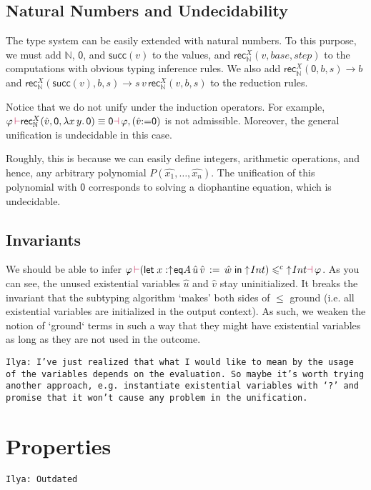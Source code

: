 \documentclass[a4,natbib=false]{article}
\newcommand{\ilyam}[1]{{\color{red} \texttt{Ilya:  #1}}}
\newcommand{\fun}[2]{\lambda {#1}.\,{#2}}
\newcommand{\letname}{\mathsf{let}}
\newcommand{\letval}[3]{\letname\; {#1} \,:=\, {#2} \;\mathsf{in}\; {#3}}
\newcommand{\valtocomp}[1]{\uparrow \hspace{-2pt} #1}
\newcommand{\eqtype}[3]{\mathsf{eq}{#1}\,{#2}\,{#3}}
\newcommand{\csubt}{\leqslant^c}
\newcommand{\evarassign}[2]{({#1} \mathsf{:=} {#2})}
\newcommand{\reduces}[2]{{#1} \rightarrow {#2}}
\newcommand{\nattype}{\mathbb{N}}
\newcommand{\natzero}{\mathsf{0}}
\newcommand{\natsucc}[1]{\mathsf{succ}({#1})}
\newcommand{\recnat}[4]{\mathsf{rec}_{\nattype}^{#2}({#1},{#3},{#4})}
\newcommand{\judgeacsubt}[4]{{#1}\,{\color{purple}\vdash} {#2} \csubt {#3} {\color{purple}\dashv}\,{#4}}
\newcommand{\judgeunify}[4]{{#1}\,{\color{purple}\vdash} {#2} \equiv {#3} {\color{purple}\dashv}\,{#4}}
\begin{document}
\subsection{Natural Numbers and Undecidability}

The type system can be easily extended with natural numbers. To this purpose, we
must add $\nattype$, $\natzero$, and $\natsucc{v}$ to the values, and
$\recnat{v}{X}{base}{step}$ to the computations with obvious typing inference
rules.
We also add $\reduces{\recnat{\natzero}{X}{b}{s}}{b}$ and
$\reduces{\recnat{\natsucc{v}}{X}{b}{s}}{s \, v \, \recnat{v}{X}{b}{s}}$ to the reduction rules.

Notice that we do not unify under the induction operators. For example,
$\judgeunify{\varphi}{\recnat{\hat{v}}{X}{\natzero}{\fun{x\,y}{\natzero}}}{\natzero}{\varphi, \evarassign{\hat{v}}{\natzero}}$
is not admissible.
Moreover, the general unification is undecidable in this case.

Roughly, this is because we can easily define integers,
arithmetic operations, and hence, any arbitrary polynomial
$P(\hat{x_1}, \dots, \hat{x_n})$.
The unification of this polynomial with $\natzero$
corresponds to solving a diophantine equation, which is undecidable.

\subsection{Invariants}

We should be able to infer
$\judgeacsubt{\varphi}{(\letval{x:\valtocomp{\eqtype{A}{\hat{u}}{\hat{v}}}}{\hat{w}}{\valtocomp{Int}})}{\valtocomp{Int}}{\varphi}$.
As you can see, the unused existential variables $\hat{u}$ and $\hat{v}$ stay uninitialized.
It breaks the invariant that the subtyping algorithm `makes' both sides of $\leqslant$ ground (i.e. all existential variables are initialized in the output context).
As such, we weaken the notion of `ground` terms in such a way that they might have existential variables as long as they are not used in the outcome.

\ilyam{I've just realized that what I would like to mean by the usage of the variables depends on the evaluation. So maybe it's worth trying another approach,
  e.g. instantiate existential variables with `?' and promise that it won't cause any problem in the unification. }


\section{Properties}
\ilyam{Outdated}
\end{document}
